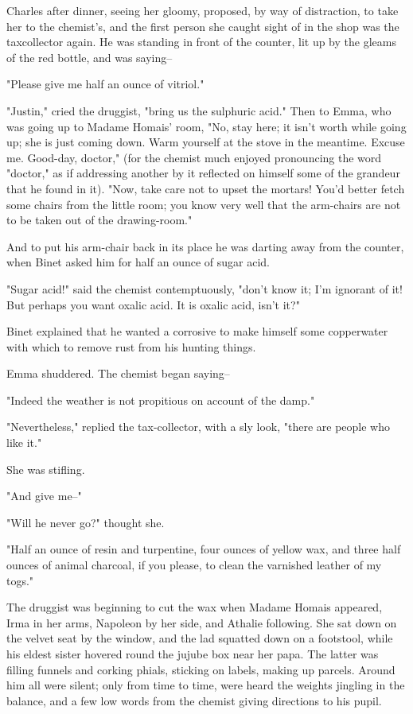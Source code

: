 \documentclass[11pt,twocolumn]{ltugboat}
\begin{document}
Charles after dinner, seeing her gloomy, proposed, by way of
distraction, to take her to the chemist's, and the first person she
caught sight of in the shop was the taxcollector again. He was standing
in front of the counter, lit up by the gleams of the red bottle, and was
saying--

"Please give me half an ounce of vitriol."

"Justin," cried the druggist, "bring us the sulphuric acid." Then to
Emma, who was going up to Madame Homais' room, "No, stay here; it isn't
worth while going up; she is just coming down. Warm yourself at the
stove in the meantime. Excuse me. Good-day, doctor," (for the chemist
much enjoyed pronouncing the word "doctor," as if addressing another by
it reflected on himself some of the grandeur that he found in it). "Now,
take care not to upset the mortars! You'd better fetch some chairs from
the little room; you know very well that the arm-chairs are not to be
taken out of the drawing-room."

And to put his arm-chair back in its place he was darting away from the
counter, when Binet asked him for half an ounce of sugar acid.

"Sugar acid!" said the chemist contemptuously, "don't know it; I'm
ignorant of it! But perhaps you want oxalic acid. It is oxalic acid,
isn't it?"

Binet explained that he wanted a corrosive to make himself some
copperwater with which to remove rust from his hunting things.

Emma shuddered. The chemist began saying--

"Indeed the weather is not propitious on account of the damp."

"Nevertheless," replied the tax-collector, with a sly look, "there are
people who like it."

She was stifling.

"And give me--"

"Will he never go?" thought she.

"Half an ounce of resin and turpentine, four ounces of yellow wax,
and three half ounces of animal charcoal, if you please, to clean the
varnished leather of my togs."

The druggist was beginning to cut the wax when Madame Homais appeared,
Irma in her arms, Napoleon by her side, and Athalie following. She sat
down on the velvet seat by the window, and the lad squatted down on a
footstool, while his eldest sister hovered round the jujube box near
her papa. The latter was filling funnels and corking phials, sticking on
labels, making up parcels. Around him all were silent; only from time
to time, were heard the weights jingling in the balance, and a few low
words from the chemist giving directions to his pupil.
\end{document}
